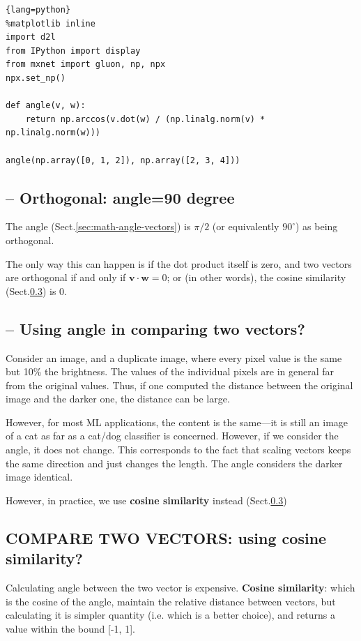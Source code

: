 \begin{lstlisting}{lang=python}
%matplotlib inline
import d2l
from IPython import display
from mxnet import gluon, np, npx
npx.set_np()

def angle(v, w):
    return np.arccos(v.dot(w) / (np.linalg.norm(v) * np.linalg.norm(w)))

angle(np.array([0, 1, 2]), np.array([2, 3, 4]))
\end{lstlisting}

\subsection{-- Orthogonal: angle=90 degree}

The angle (Sect.\ref{sec:math-angle-vectors}) is $\pi/2$ (or equivalently
$90^{\circ}$) as being orthogonal.	

The only way this can happen is if the dot product itself is zero, and two
vectors are orthogonal if and only if $\mathbf{v}\cdot\mathbf{w} = 0$; or (in
other words), the cosine similarity (Sect.\ref{sec:math-cosine-similarity}) is
0.

\subsection{-- Using angle in comparing two vectors?}

Consider an image, and a duplicate image, where every pixel value is the same
but 10\% the brightness. The values of the individual pixels are in general far
from the original values. Thus, if one computed the distance between the
original image and the darker one, the distance can be large.

However, for most ML applications, the content is the same---it is still an
image of a cat as far as a cat/dog classifier is concerned. However, if we
consider the angle, it does not change.
This corresponds to the fact that scaling vectors keeps the same direction and
just changes the length. The angle considers the darker image identical.

However, in practice, we use {\bf cosine similarity} instead (Sect.\ref{sec:math-cosine-similarity})

\subsection{COMPARE TWO VECTORS: using {\bf cosine similarity}?}
\label{sec:math-cosine-similarity}

Calculating angle between the two vector is expensive. {\bf Cosine similarity}:
which is the cosine of the angle, maintain the relative distance between
vectors, but calculating it is simpler quantity (i.e. which is a better choice),
and returns a value within the bound [-1, 1].


